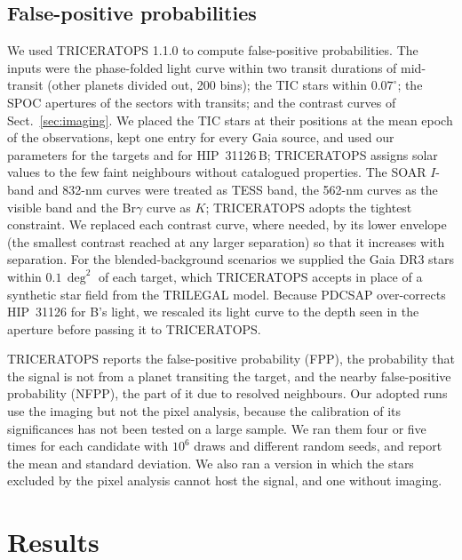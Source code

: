 \documentclass[twocolumn,numberedappendix,appendixfloats]{openjournal}
\begin{document}
\subsection{False-positive probabilities}
\label{sec:fppmethod}

We used TRICERATOPS 1.1.0 \citep{giacalone2021,giacalone2022} to compute
false-positive probabilities. The inputs were the phase-folded light
curve within two transit durations of mid-transit (other planets divided out,
200 bins); the TIC stars within $0.07^\circ$; the SPOC apertures of the
sectors with transits; and the contrast curves of Sect.~\ref{sec:imaging}. We
placed the TIC stars at their positions at the mean epoch of the observations,
kept one entry for every Gaia source, and used our parameters for the targets
and for HIP~31126\,B; TRICERATOPS assigns solar values to the few faint
neighbours without catalogued properties. The
SOAR $I$-band and 832-nm curves were treated as TESS band, the 562-nm curves as
the visible band and the Br$\gamma$ curve as $K$; TRICERATOPS adopts the
tightest constraint. We replaced each contrast curve, where needed, by its
lower envelope (the smallest contrast reached at any larger separation) so that
it increases with separation. For the blended-background scenarios we
supplied the Gaia DR3 stars within $0.1\,\deg^2$ of each target, which
TRICERATOPS accepts in place of a synthetic star field from the TRILEGAL model.
Because PDCSAP over-corrects HIP~31126 for B's light, we rescaled its light
curve to the depth seen in the aperture before passing it to TRICERATOPS.

TRICERATOPS reports the false-positive probability (FPP), the probability that
the signal is not from a planet transiting the target, and the nearby
false-positive probability (NFPP), the part of it due to resolved neighbours.
Our adopted runs use the imaging but not the pixel analysis, because the
calibration of its significances has not been tested on a large sample. We ran them four or five times
for each candidate with $10^6$ draws and different random seeds, and report
the mean and standard deviation. We also ran a version in which the stars excluded by the pixel
analysis cannot host the signal, and one without imaging.

\section{Results}
\label{sec:results}
\end{document}
